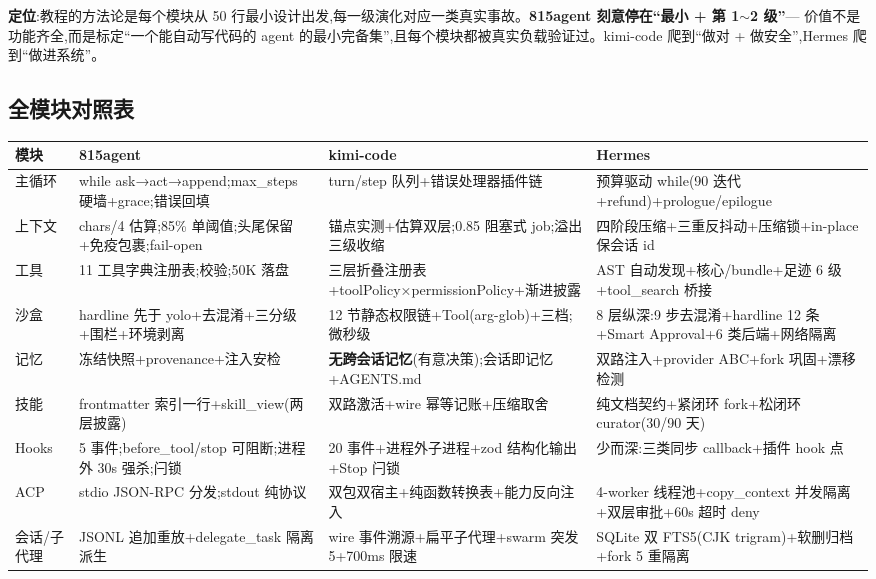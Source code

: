 \documentclass[10pt,a4paper]{article}
\makeatletter
\renewcommand{\small}{\fontsize{8}{11.5}\selectfont}
\newenvironment{notebox}
{\par\vspace{4pt}\setlength{\fboxsep}{5pt}%
 \begin{lrbox}{\mdbox@tmp}\begin{minipage}{\dimexpr\linewidth-14pt\relax}\small}
{\end{minipage}\end{lrbox}%
 \noindent\fcolorbox{linec}{notec}{\usebox{\mdbox@tmp}}\par\vspace{3pt}}
\makeatother
\begin{document}
\begin{notebox}
\textbf{定位}:教程的方法论是每个模块从 50 行最小设计出发,每一级演化对应一类真实事故。\textbf{815agent 刻意停在``最小 + 第 1$\sim$2 级''}--- 价值不是功能齐全,而是标定``一个能自动写代码的 agent 的最小完备集'',且每个模块都被真实负载验证过。kimi-code 爬到``做对 + 做安全'',Hermes 爬到``做进系统''。
\end{notebox}

\subsection{全模块对照表}
{\small
\begin{longtable}{|L{0.09\textwidth}|L{0.28\textwidth}|L{0.28\textwidth}|L{0.26\textwidth}|}
\hline
{}\textbf{模块} & \textbf{815agent} & \textbf{kimi-code} & \textbf{Hermes}\\\hline\endhead
主循环 & while ask→act→append;max\_steps 硬墙+grace;错误回填 & turn/step 队列+错误处理器插件链 & 预算驱动 while(90 迭代+refund)+prologue/epilogue\\\hline
上下文 & chars/4 估算;85\% 单阈值;头尾保留+免疫包裹;fail-open & 锚点实测+估算双层;0.85 阻塞式 job;溢出三级收缩 & 四阶段压缩+三重反抖动+压缩锁+in-place 保会话 id\\\hline
工具 & 11 工具字典注册表;校验;50K 落盘 & 三层折叠注册表+toolPolicy×permissionPolicy+渐进披露 & AST 自动发现+核心/bundle+足迹 6 级+tool\_search 桥接\\\hline
沙盒 & hardline 先于 yolo+去混淆+三分级+围栏+环境剥离 & 12 节静态权限链+Tool(arg-glob)+三档;微秒级 & 8 层纵深:9 步去混淆+hardline 12 条+Smart Approval+6 类后端+网络隔离\\\hline
记忆 & 冻结快照+provenance+注入安检 & \textbf{无跨会话记忆}(有意决策);会话即记忆+AGENTS.md & 双路注入+provider ABC+fork 巩固+漂移检测\\\hline
技能 & frontmatter 索引一行+skill\_view(两层披露) & 双路激活+wire 幂等记账+压缩取舍 & 纯文档契约+紧闭环 fork+松闭环 curator(30/90 天)\\\hline
Hooks & 5 事件;before\_tool/stop 可阻断;进程外 30s 强杀;闩锁 & 20 事件+进程外子进程+zod 结构化输出+Stop 闩锁 & 少而深:三类同步 callback+插件 hook 点\\\hline
ACP & stdio JSON-RPC 分发;stdout 纯协议 & 双包双宿主+纯函数转换表+能力反向注入 & 4-worker 线程池+copy\_context 并发隔离+双层审批+60s 超时 deny\\\hline
会话/子代理 & JSONL 追加重放+delegate\_task 隔离派生 & wire 事件溯源+扁平子代理+swarm 突发 5+700ms 限速 & SQLite 双 FTS5(CJK trigram)+软删归档+fork 5 重隔离\\\hline
\end{longtable}}
\end{document}
